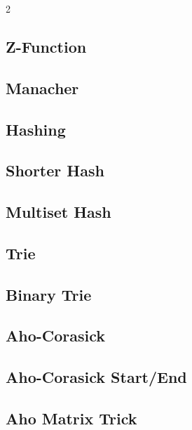\documentclass[10pt,a4paper]{extarticle}
\begin{document}
\begin{landscape}
\begin{multicols}{2}
\subsection{Z-Function}


\subsection{Manacher}


\subsection{Hashing}


\subsection{Shorter Hash}


\subsection{Multiset Hash}


\subsection{Trie}


\subsection{Binary Trie}


\subsection{Aho-Corasick}


\subsection{Aho-Corasick Start/End}


\subsection{Aho Matrix Trick}



\end{multicols}
\end{landscape}
\end{document}
